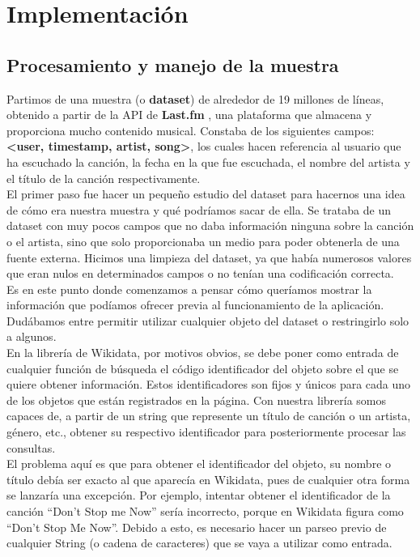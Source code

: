 \chapter{Implementación}
\label{cap:implementacion}

\section{Procesamiento y manejo de la muestra}

Partimos de una muestra (o \textbf{dataset}) de alrededor de 19 millones de líneas, obtenido a partir de la API de \textbf{Last.fm} \cite{lastfm}, una plataforma que almacena y proporciona mucho contenido musical. Constaba de los siguientes campos: \textbf{<user, timestamp, artist, song>}, los cuales hacen referencia al usuario que ha escuchado la canción, la fecha en la que fue escuchada, el nombre del artista y el título de la canción respectivamente.\\

El primer paso fue hacer un pequeño estudio del dataset para hacernos una idea de cómo era nuestra muestra y qué podríamos sacar de ella. Se trataba de un dataset con muy pocos campos que no daba información ninguna sobre la canción o el artista, sino que solo proporcionaba un medio para poder obtenerla de una fuente externa. Hicimos una limpieza del dataset, ya que había numerosos valores que eran nulos en determinados campos o no tenían una codificación correcta.\\

Es en este punto donde comenzamos a pensar cómo queríamos mostrar la información que podíamos ofrecer previa al funcionamiento de la aplicación. Dudábamos entre permitir utilizar cualquier objeto del dataset o restringirlo solo a algunos.\\

En la librería de Wikidata, por motivos obvios, se debe poner como entrada de cualquier función de búsqueda el código identificador del objeto sobre el que se quiere obtener información. Estos identificadores son fijos y únicos para cada uno de los objetos que están registrados en la página. Con nuestra librería somos capaces de, a partir de un string que represente un título de canción o un artista, género, etc., obtener su respectivo identificador para posteriormente procesar las consultas.\\

El problema aquí es que para obtener el identificador del objeto, su nombre o título debía ser exacto al que aparecía en Wikidata, pues de cualquier otra forma se lanzaría una excepción. Por ejemplo, intentar obtener el identificador de la canción ``Don’t Stop me Now'' sería incorrecto, porque en Wikidata figura como ``Don’t Stop Me Now''. Debido a esto, es necesario hacer un parseo previo de cualquier String (o cadena de caracteres) que se vaya a utilizar como entrada.\\

